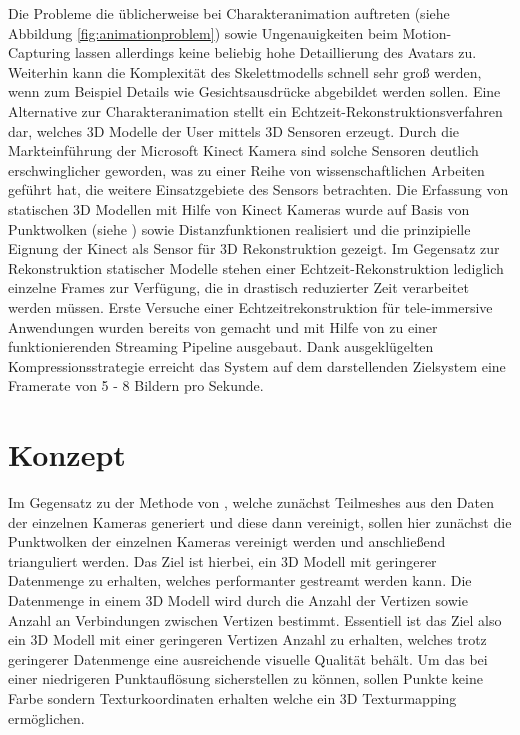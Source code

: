 Die Probleme die üblicherweise bei Charakteranimation auftreten (siehe Abbildung 
\ref{fig:animationproblem}) sowie Ungenauigkeiten beim Motion-Capturing lassen 
allerdings keine beliebig hohe Detaillierung des Avatars zu. Weiterhin kann die 
Komplexität des Skelettmodells schnell sehr groß werden, wenn zum Beispiel 
Details wie Gesichtsausdrücke abgebildet werden sollen. Eine Alternative zur 
Charakteranimation stellt ein Echtzeit-Rekonstruktionsverfahren dar, welches 
3D Modelle der User mittels 3D Sensoren erzeugt. Durch die Markteinführung der 
Microsoft Kinect Kamera sind solche Sensoren deutlich erschwinglicher geworden, 
was zu einer Reihe von wissenschaftlichen Arbeiten geführt hat, die weitere 
Einsatzgebiete des Sensors betrachten. Die Erfassung von statischen 3D Modellen 
mit Hilfe von Kinect Kameras wurde auf Basis von Punktwolken 
(siehe \cite{tong2012scanning}) sowie Distanzfunktionen 
\cite{Izadi:2011:KRR:2047196.2047270} realisiert und die prinzipielle Eignung 
der Kinect als Sensor für 3D Rekonstruktion gezeigt. Im Gegensatz zur 
Rekonstruktion statischer Modelle stehen einer Echtzeit-Rekonstruktion 
lediglich einzelne Frames zur Verfügung, die in drastisch reduzierter Zeit 
verarbeitet werden müssen. Erste Versuche einer Echtzeitrekonstruktion für 
tele-immersive Anwendungen wurden bereits von \cite{alexiadis2013real} gemacht 
und mit Hilfe von \cite{mekuria2013teleimmersion} zu einer funktionierenden 
Streaming Pipeline ausgebaut. Dank ausgeklügelten Kompressionsstrategie erreicht 
das System auf dem darstellenden Zielsystem eine Framerate von 5 - 8 Bildern 
pro Sekunde.

\section{Konzept}
Im Gegensatz zu der Methode von \cite{alexiadis2013real}, welche zunächst 
Teilmeshes aus den Daten der einzelnen Kameras generiert und diese dann 
vereinigt, sollen hier zunächst die Punktwolken der einzelnen Kameras vereinigt 
werden und anschließend trianguliert werden. Das Ziel ist hierbei, ein 3D Modell 
mit geringerer Datenmenge zu erhalten, welches performanter gestreamt werden 
kann. Die Datenmenge in einem 3D Modell wird durch die Anzahl der Vertizen sowie 
Anzahl an Verbindungen zwischen Vertizen bestimmt. Essentiell ist das Ziel also 
ein 3D Modell mit einer geringeren Vertizen Anzahl zu erhalten, welches trotz 
geringerer Datenmenge eine ausreichende visuelle Qualität behält. Um das bei 
einer niedrigeren Punktauflösung sicherstellen zu können, sollen Punkte keine 
Farbe sondern Texturkoordinaten erhalten welche ein 3D Texturmapping ermöglichen.


